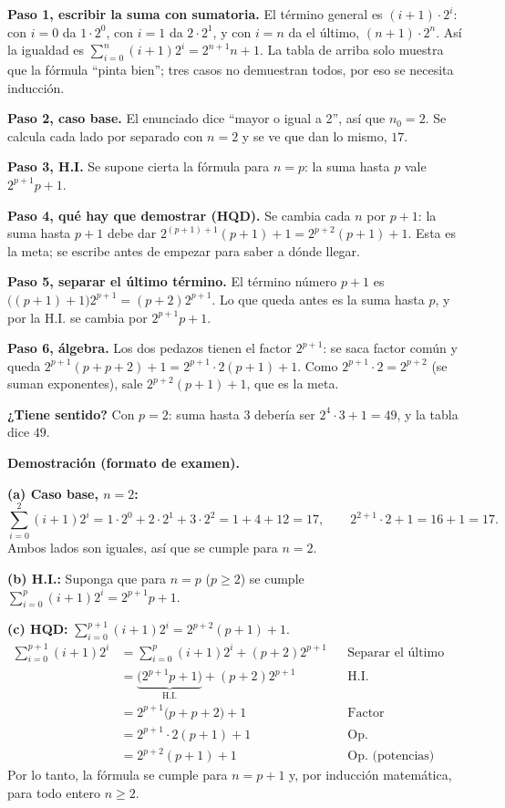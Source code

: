 \documentclass[11pt]{article}
\begin{document}
\begin{explica}
\textbf{Paso 1, escribir la suma con sumatoria.} El término general es $(i+1)\cdot 2^i$: con $i=0$ da $1\cdot2^0$, con $i=1$ da $2\cdot 2^1$, y con $i=n$ da el último, $(n+1)\cdot2^n$. Así la igualdad es $\sum_{i=0}^{n}(i+1)2^i=2^{n+1}n+1$. La tabla de arriba solo muestra que la fórmula ``pinta bien''; tres casos no demuestran todos, por eso se necesita inducción.

\textbf{Paso 2, caso base.} El enunciado dice ``mayor o igual a 2'', así que $n_0=2$. Se calcula cada lado por separado con $n=2$ y se ve que dan lo mismo, $17$.

\textbf{Paso 3, H.I.} Se supone cierta la fórmula para $n=p$: la suma hasta $p$ vale $2^{p+1}p+1$.

\textbf{Paso 4, qué hay que demostrar (HQD).} Se cambia cada $n$ por $p+1$: la suma hasta $p+1$ debe dar $2^{(p+1)+1}(p+1)+1=2^{p+2}(p+1)+1$. Esta es la meta; se escribe antes de empezar para saber a dónde llegar.

\textbf{Paso 5, separar el último término.} El término número $p+1$ es $\big((p+1)+1\big)2^{p+1}=(p+2)2^{p+1}$. Lo que queda antes es la suma hasta $p$, y por la H.I. se cambia por $2^{p+1}p+1$.

\textbf{Paso 6, álgebra.} Los dos pedazos tienen el factor $2^{p+1}$: se saca factor común y queda $2^{p+1}(p+p+2)+1=2^{p+1}\cdot2(p+1)+1$. Como $2^{p+1}\cdot 2=2^{p+2}$ (se suman exponentes), sale $2^{p+2}(p+1)+1$, que es la meta.

\textbf{¿Tiene sentido?} Con $p=2$: suma hasta $3$ debería ser $2^{4}\cdot 3+1=49$, y la tabla dice $49$.
\end{explica}

\textbf{Demostración (formato de examen).}

\textbf{(a) Caso base, $n=2$:}
\[\sum_{i=0}^{2}(i+1)2^i=1\cdot2^0+2\cdot2^1+3\cdot2^2=1+4+12=17,\qquad 2^{2+1}\cdot2+1=16+1=17.\]
Ambos lados son iguales, así que se cumple para $n=2$.

\textbf{(b) H.I.:} Suponga que para $n=p$ ($p\ge2$) se cumple $\displaystyle\sum_{i=0}^{p}(i+1)2^i=2^{p+1}p+1$.

\textbf{(c) HQD:} $\displaystyle\sum_{i=0}^{p+1}(i+1)2^i=2^{p+2}(p+1)+1$.
\begin{align*}
\sum_{i=0}^{p+1}(i+1)2^i &=\sum_{i=0}^{p}(i+1)2^i+(p+2)2^{p+1} && \text{Separar el último término}\\
&=\underbrace{\big(2^{p+1}p+1\big)}_{\text{H.I.}}+(p+2)2^{p+1} && \text{H.I.}\\
&=2^{p+1}\big(p+p+2\big)+1 && \text{Factor}\\
&=2^{p+1}\cdot 2(p+1)+1 && \text{Op.}\\
&=2^{p+2}(p+1)+1 && \text{Op. (potencias)}
\end{align*}
Por lo tanto, la fórmula se cumple para $n=p+1$ y, por inducción matemática, para todo entero $n\ge2$.
\end{document}

